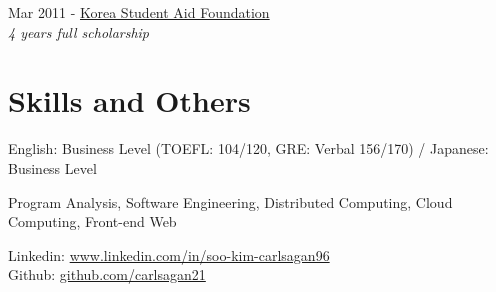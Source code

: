 \documentclass[10pt]{article} %
\begin{document}
{
Mar 2011 - \href{http://eng.kosaf.go.kr/jsp/main.jsp}{Korea Student Aid Foundation}\\
\textit{4 years full scholarship}\\
}
\fi


\section{Skills and Others}

{
English: Business Level (TOEFL: 104/120, GRE: Verbal 156/170) / Japanese: Business Level
}

{
Program Analysis, Software Engineering, Distributed Computing, Cloud Computing, Front-end Web
}

{
Linkedin: \href{https://www.linkedin.com/in/soo-kim-carlsagan96}{www.linkedin.com/in/soo-kim-carlsagan96}\\
Github: \href{https://github.com/carlsagan21}{github.com/carlsagan21}
}

\end{document}
